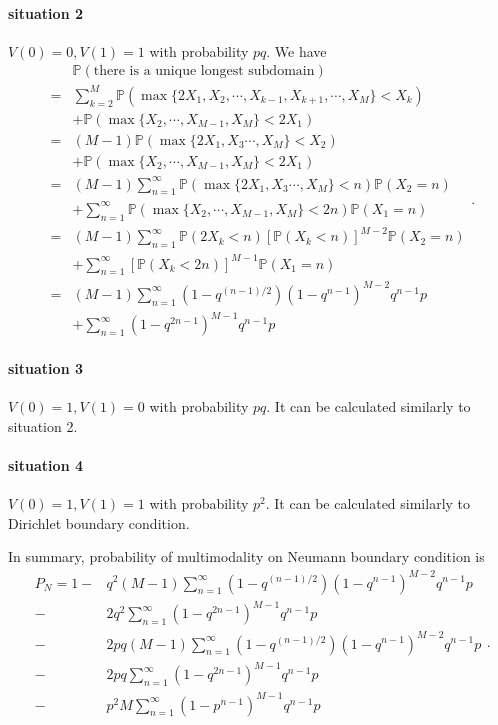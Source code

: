\documentclass[a4paper,11pt]{article}
\begin{document}
\begin{appendices}
\paragraph*{situation 2}
$V(0) = 0, V(1) = 1$ with probability $p q$. We have
\begin{equation*}
\begin{split}
  & \mathbb{P}(\text{there is a unique longest subdomain}) \\
= & \sum_{k=2}^{M} \mathbb{P}(\max\{2 X_1, X_2, \cdots, X_{k-1}, X_{k+1}, \cdots, X_{M}\} < X_k) \\
& + \mathbb{P}(\max\{X_2, \cdots, X_{M-1}, X_M\} < 2 X_1) \\
= & (M-1) \mathbb{P}(\max\{2 X_1, X_3 \cdots, X_{M}\} < X_2) \\
& + \mathbb{P}(\max\{X_2, \cdots, X_{M-1}, X_M\} < 2 X_1) \\
= & (M-1) \sum_{n=1}^{\infty} \mathbb{P}(\max\{2 X_1, X_3 \cdots, X_{M}\} < n) \mathbb{P}(X_2 = n) \\
& + \sum_{n=1}^{\infty} \mathbb{P}(\max\{X_2, \cdots, X_{M-1}, X_M\} < 2 n) \mathbb{P}(X_1 = n) \\
= & (M-1) \sum_{n=1}^{\infty} \mathbb{P}(2 X_k < n) [\mathbb{P}(X_k < n)]^{M-2} \mathbb{P}(X_2 = n) \\
& + \sum_{n=1}^{\infty} [\mathbb{P}(X_k < 2 n)]^{M-1} \mathbb{P}(X_1 = n) \\
= & (M-1) \sum_{n=1}^{\infty} (1 - q^{(n-1)/2}) (1 - q^{n-1})^{M-2} q^{n-1} p \\
& + \sum_{n=1}^{\infty} (1 - q^{2n-1})^{M-1} q^{n-1} p
\end{split}.
\end{equation*}

\paragraph*{situation 3}
$V(0) = 1, V(1) = 0$ with probability $p q$. It can be calculated similarly to situation 2.

\paragraph*{situation 4}
$V(0) = 1, V(1) = 1$ with probability $p^2$. It can be calculated similarly to Dirichlet boundary condition.

In summary, probability of multimodality on Neumann boundary condition is
\begin{equation*}
\begin{split}
P_N = 1 - & q^2 (M-1) \sum_{n=1}^{\infty} (1 - q^{(n-1)/2}) (1 - q^{n-1})^{M-2} q^{n-1} p \\
- & 2 q^2 \sum_{n=1}^{\infty} (1 - q^{2n-1})^{M-1} q^{n-1} p \\
- & 2 p q (M-1) \sum_{n=1}^{\infty} (1 - q^{(n-1)/2}) (1 - q^{n-1})^{M-2} q^{n-1} p \\
- & 2 p q \sum_{n=1}^{\infty} (1 - q^{2n-1})^{M-1} q^{n-1} p \\
- & p^2 M \sum_{n=1}^{\infty} (1 - p^{n-1})^{M-1} q^{n-1} p
\end{split}.
\end{equation*}


\end{appendices}
\end{document}
